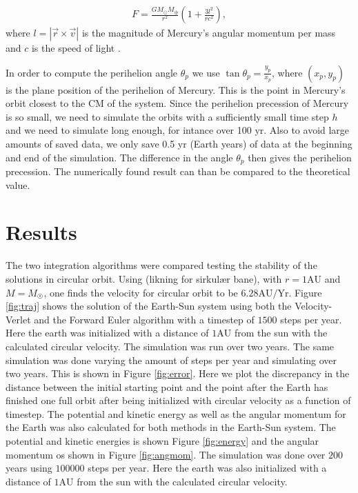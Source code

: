 \documentclass[twocolumn]{aastex62}
\begin{document}
\begin{align}
    F = \frac{G M_\odot M_\oplus}{r^2}\left(1 + \frac{3l^2}{r c^2}\right),
\end{align}
where $l = |\vec{r}\times \vec{v}|$ is the magnitude of Mercury's angular
momentum per mass and $c$ is the speed of light \cite{jensen:2019}.

In order to compute the perihelion angle $\theta_p$ we use $\tan \theta_p =
\frac{y_p}{x_p}$, where $(x_p, y_p)$ is the plane position of the perihelion of
Mercury. This is the point in Mercury's orbit closest to the CM of the system.
Since the perihelion precession of Mercury is so small, we need to simulate the
orbits with a sufficiently small time step $h$ and we need to simulate long
enough, for intance over 100 yr. Also to avoid large amounts of
saved data, we only save 0.5 yr (Earth years) of data at the beginning and end of the
simulation. The difference in the angle $\theta_p$ then gives the perihelion
precession. The numerically found result can than be compared to the theoretical
value.

\section{Results} \label{sec:results}
The two integration algorithms were compared testing the stability of the
solutions in circular orbit. Using (likning for sirkulær bane), with
$r=1\mathrm{AU}$ and $M=M_{\astrosun}$, one finds the velocity for circular
orbit to be $6.28\mathrm{AU/Yr}$. Figure \ref{fig:traj} shows the solution of
the Earth-Sun system using both the Velocity-Verlet and the Forward Euler
algorithm with a timestep of $1500$ steps per year. Here the earth was
initialized with a distance of $1\mathrm{AU}$ from the sun with the calculated
circular velocity. The simulation was run over two years. The same simulation
was done varying the amount of steps per year and simulating over two years.
This is shown in Figure \ref{fig:error}. Here we plot the discrepancy in the
distance between the initial starting point and the point after the Earth has
finished one full orbit after being initialized with circular velocity as a
function of timestep. The potential and kinetic energy as well as the angular
momentum for the Earth was also calculated for both methods in the Earth-Sun system. The
potential and kinetic energies is shown Figure \ref{fig:energy} and the angular
momentum os shown in Figure \ref{fig:angmom}. The simulation was done over $200$
years using $100000$ steps per year. Here the earth was also initialized with a
distance of $1\mathrm{AU}$ from the sun with the calculated circular velocity.
\end{document}
